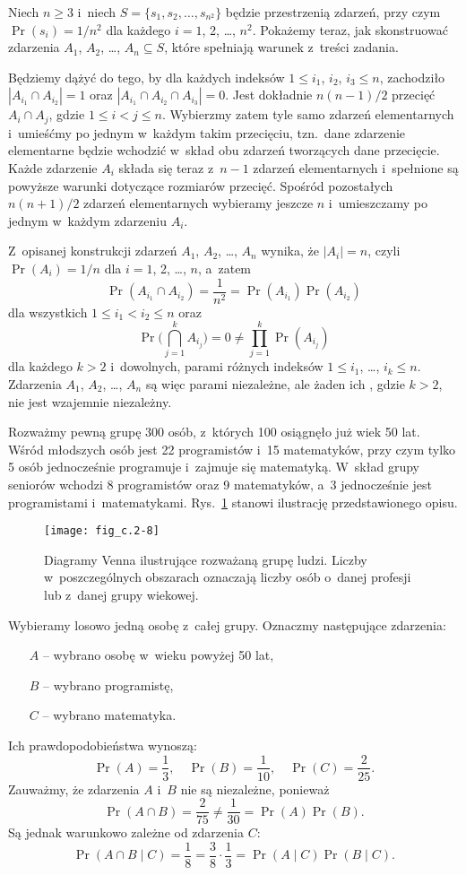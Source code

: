 \exercise %
Niech $n\ge3$ i~niech $S=\{s_1,s_2,\dots,s_{n^2}\}$ będzie przestrzenią zdarzeń, przy czym $\Pr(s_i)=1/n^2$ dla każdego $i=1$, 2, \dots, $n^2$.
Pokażemy teraz, jak skonstruować zdarzenia $A_1$, $A_2$, \dots, $A_n\subseteq S$, które spełniają warunek z~treści zadania.

Będziemy dążyć do tego, by dla każdych indeksów $1\le i_1$, $i_2$, $i_3\le n$, zachodziło $|A_{i_1}\cap A_{i_2}|=1$ oraz $|A_{i_1}\cap A_{i_2}\cap A_{i_3}|=0$.
Jest dokładnie $n(n-1)/2$ przecięć $A_i\cap A_j$, gdzie $1\le i<j\le n$.
Wybierzmy zatem tyle samo zdarzeń elementarnych i~umieśćmy po jednym w~każdym takim przecięciu, tzn.\ dane zdarzenie elementarne będzie wchodzić w~skład obu zdarzeń tworzących dane przecięcie.
Każde zdarzenie $A_i$ składa się teraz z~$n-1$ zdarzeń elementarnych i~spełnione są powyższe warunki dotyczące rozmiarów przecięć.
Spośród pozostałych $n(n+1)/2$ zdarzeń elementarnych wybieramy jeszcze $n$ i~umieszczamy po jednym w~każdym zdarzeniu $A_i$.

Z~opisanej konstrukcji zdarzeń $A_1$, $A_2$, \dots, $A_n$ wynika, że $|A_i|=n$, czyli $\Pr(A_i)=1/n$ dla $i=1$, 2, \dots, $n$, a~zatem
\[
	\Pr(A_{i_1}\cap A_{i_2}) = \frac{1}{n^2} = \Pr(A_{i_1})\Pr(A_{i_2})
\]
dla wszystkich $1\le i_1<i_2\le n$ oraz
\[
	\Pr\biggl(\bigcap_{j=1}^kA_{i_j}\biggr) = 0 \ne \prod_{j=1}^k\Pr(A_{i_j})
\]
dla każdego $k>2$ i~dowolnych, parami różnych indeksów $1\le i_1$, \dots, $i_k\le n$.
Zdarzenia $A_1$, $A_2$, \dots, $A_n$ są więc parami niezależne, ale żaden ich , gdzie $k>2$, nie jest wzajemnie niezależny.

\exercise %
Rozważmy pewną grupę 300 osób, z~których 100 osiągnęło już wiek 50 lat.
Wśród młodszych osób jest 22 programistów i~15 matematyków, przy czym tylko 5 osób jednocześnie programuje i~zajmuje się matematyką.
W~skład grupy seniorów wchodzi 8 programistów oraz 9 matematyków, a~3 jednocześnie jest programistami i~matematykami.
Rys.\ \ref{fig:C.2-8} stanowi ilustrację przedstawionego opisu.
\begin{figure}[ht]
	\centering \texttt{[image: fig\_c.2-8]}
	\caption{Diagramy Venna ilustrujące rozważaną grupę ludzi.
Liczby w~poszczególnych obszarach oznaczają liczby osób o~danej profesji lub z~danej grupy wiekowej.} \label{fig:C.2-8}
\end{figure}

Wybieramy losowo jedną osobę z~całej grupy.
Oznaczmy następujące zdarzenia:
\begin{itemize}
	\item[$A$] -- wybrano osobę w~wieku powyżej 50 lat,
	\item[$B$] -- wybrano programistę,
	\item[$C$] -- wybrano matematyka.
\end{itemize}
Ich prawdopodobieństwa wynoszą:
\[
	\Pr(A) = \frac{1}{3}, \quad \Pr(B) = \frac{1}{10}, \quad \Pr(C) = \frac{2}{25}.
\]
Zauważmy, że zdarzenia $A$ i~$B$ nie są niezależne, ponieważ
\[
	\Pr(A\cap B) = \frac{2}{75} \ne \frac{1}{30} = \Pr(A)\Pr(B).
\]
Są jednak warunkowo zależne od zdarzenia $C$:
\[
	\Pr(A\cap B\mid C) = \frac{1}{8} = \frac{3}{8}\cdot\frac{1}{3} = \Pr(A\mid C)\Pr(B\mid C).
\]

